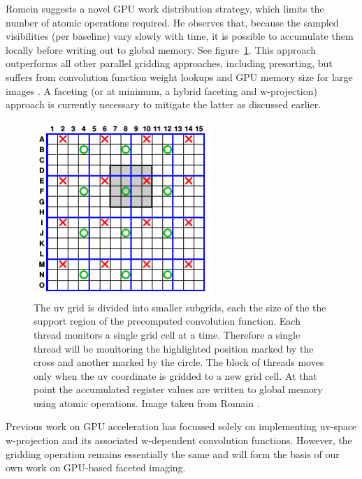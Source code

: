 \documentclass[a4paper, two column]{article}
\begin{document}
Romein \cite{romein2012efficient} suggests a novel GPU work distribution strategy, which limits the number of atomic operations required. He observes that, because 
the sampled visibilities (per baseline) vary slowly with time, it is possible to accumulate them locally before writing out to global memory. See 
figure~\ref{IMG_WORK_DIST_STRATEGY}. This approach outperforms all other parallel gridding approaches, including presorting, but suffers from convolution function 
weight lookups and GPU memory size for large images \cite{muscat2014high}. A faceting (or at minimum, a hybrid faceting and w-projection) approach is currently 
necessary to mitigate the latter as discussed earlier.

\begin{figure}
 \begin{mdframed}
  \centering
  \includegraphics[width=0.6\textwidth]{work_dist_strategy.png}
  \caption{The uv grid is divided into smaller subgrids, each the size of the the support region of the precomputed convolution function. Each thread monitors a single
  grid cell at a time. Therefore a single thread will be monitoring the highlighted position marked by the cross and another marked by the circle. The block of threads 
  moves only when the uv coordinate is gridded to a new grid cell. At that point the accumulated register values are written to global memory using atomic operations. Image
  taken from Romain \cite{romein2012efficient}.}
  \label{IMG_WORK_DIST_STRATEGY}
 \end{mdframed}
\end{figure}

Previous work on GPU acceleration has focussed solely on implementing uv-space w-projection and its associated w-dependent convolution functions. However, the gridding 
operation remains essentially the same and will form the basis of our own work on GPU-based faceted imaging.
\end{document}
